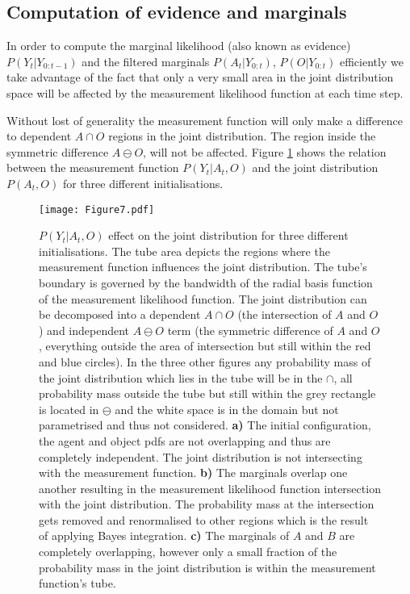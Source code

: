 \documentclass[review]{elsarticle}
\numberwithin{equation}{section}
\begin{document}
\subsection{Computation of evidence and marginals}

In order to compute the marginal likelihood (also known as evidence) $P(Y_t|Y_{0:t-1})$ and the filtered  marginals $P(A_t|Y_{0:t})$,
$P(O|Y_{0:t})$ efficiently we take advantage of the fact that only a very small area 
in the joint distribution space will be affected by the measurement likelihood function at each time step.

Without lost of generality the measurement function will only make a difference to dependent $A \cap O$ regions in the joint distribution. 
The region inside the symmetric difference $A \ominus O$, will not be affected.
Figure \ref{fig:overlap_dependence_independence} shows the relation between the measurement 
function $P(Y_t|A_t,O)$ and the joint distribution $P(A_t,O)$ for three different initialisations. 

 \begin{figure}
 \centering
  \texttt{[image: Figure7.pdf]}
  \caption{
 $P(Y_t|A_t,O)$ effect on the joint distribution for three different initialisations. 
  The tube area depicts the regions where the measurement function influences the joint distribution. 
  The tube's boundary is governed by the bandwidth of the radial basis function of the measurement likelihood function.
  The joint distribution can be decomposed into a dependent $A \cap O$ (the intersection of $A$ and $O$) and independent $A \ominus O$ term 
  (the symmetric difference of $A$ and $O$, everything outside the area of intersection but still within the red and blue circles). 
  In the three other figures any probability mass of the joint  distribution which lies in the tube will be in the $\cap$, all probability 
  mass outside the tube but still within the grey rectangle is located in $\ominus$ and 
 the white space is in the domain but not parametrised and thus not considered. \textbf{a)} The initial configuration, the agent and object pdfs 
 are not overlapping and thus are completely independent. The joint distribution is not intersecting with the measurement function.
 \textbf{b)} The marginals overlap one another resulting in the measurement likelihood function intersection with the joint distribution.
 The probability mass at the intersection gets removed and renormalised to other regions which is the result of applying Bayes integration. 
 \textbf{c)} The marginals of $A$ and $B$ are completely overlapping, however only a small fraction of the probability mass in the joint distribution 
 is within the measurement function's tube.}
  \label{fig:overlap_dependence_independence}
\end{figure}
\end{document}
